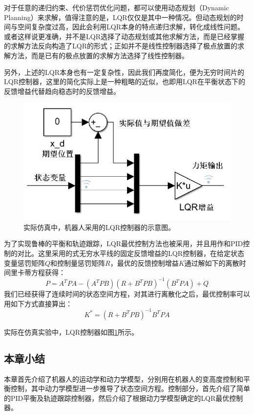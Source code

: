 对于任意的递归约束、代价惩罚优化问题，都可以使用动态规划（Dynamic Planning）来求解，值得注意的是，LQR仅仅是其中一种情况。但动态规划的时间与空间复杂度过高，因此会利用LQR本身的特点递归求解，转化成线性问题。或者这样说更准确，并不是LQR选择了动态规划或其他求解方法，而是已经掌握的求解方法反向构造了LQR的形式；正如并不是线性控制器选择了极点放置的求解方法，而是已有的极点放置的求解方法选择了线性控制器。

另外，上述的LQR本身也有一定复杂性，因此我们再度简化，便为无穷时间片的LQR控制器，这里的简化实际上是一种粗略的近似，也即用LQR在平衡状态下的反馈增益代替趋向稳态时的反馈增益。

\begin{figure}[h!]
  \centering
  \includegraphics[width=0.65\linewidth]{figures/Sec4/lqrgram.png}
  \caption{
  实际仿真中，机器人采用的LQR控制器的示意图。
  }
  \label{fig:sec4-lqrgram}
   \vspace{6pt}
\end{figure}

为了实现鲁棒的平衡和轨迹跟踪，LQR\cite{li2012advanced}最优控制方法也被采用，并且用作和PID控制的对比。这里采用的式无穷水平线的固定反馈增益的LQR控制器，在给定状态变量惩罚矩阵$Q$和控制量惩罚矩阵$R$，最优的反馈控制增益$K$通过解如下的离散时间里卡蒂方程获得：
\begin{equation}
    P=A^TPA-(A^TPB)(R+B^TPB)^{-1}(B^TPA)+Q
    \label{eq:dare}
\end{equation}
我们已经获得了连续时间的状态空间方程，对其进行离散化之后，最优控制率可以用如下方式直接算出：
\begin{equation}
    K^* = (R+B^TPB)^{-1}B^TPA
    \label{eq:dare_sol}
\end{equation}

实际在仿真实验中，LQR控制器如图\ref{fig:sec4-lqrgram}所示。

\subsection{本章小结}

本章首先介绍了机器人的运动学和动力学模型，分别用在机器人的变高度控制和平衡控制，其中动力学模型进一步推导了状态空间方程。控制部分，首先介绍了简单的PID平衡及轨迹跟踪控制器，然后介绍了根据动力学模型确定的LQR最优控制器。

